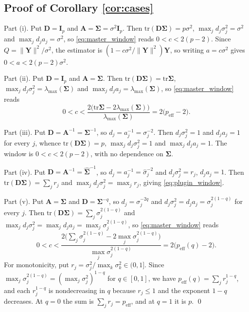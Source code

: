 \documentclass[a4paper,fleqn]{cas-sc}
\theoremstyle{plain}
\theoremstyle{definition}
\theoremstyle{remark}
\newenvironment{revblock}{}{}
\newcommand{\peff}{p_{\mathrm{eff}}}
\newcommand{\peffq}[1]{p_{\mathrm{eff}}(#1)}
\newcommand{\tr}{\mathrm{tr}}
\begin{document}
\begin{appendices}
\subsection*{Proof of Corollary \ref{cor:cases}}

Part (i). Put $\bm D=\bm I_p$ and $\bm A=\bm\Sigma=\sigma^2\bm I_p$. Then $\tr(\bm D\bm\Sigma)=p\sigma^2$, $\max_jd_j\sigma^2_j=\sigma^2$ and $\max_jd_ja_j=\sigma^2$, so \eqref{eq:master_window} reads $0<c<2(p-2)$. Since $Q=\|\bm Y\|^2/\sigma^2$, the estimator is $(1-c\sigma^2/\|\bm Y\|^2)\bm Y$, so writing $a=c\sigma^2$ gives $0<a<2(p-2)\sigma^2$.

Part (ii). Put $\bm D=\bm I_p$ and $\bm A=\bm\Sigma$. Then $\tr(\bm D\bm\Sigma)=\tr\bm\Sigma$, $\max_jd_j\sigma^2_j=\lambda_{\max}(\bm\Sigma)$ and $\max_jd_ja_j=\lambda_{\max}(\bm\Sigma)$, so \eqref{eq:master_window} reads
\begin{equation}
0<c<\frac{2\bigl(\tr\bm\Sigma-2\lambda_{\max}(\bm\Sigma)\bigr)}{\lambda_{\max}(\bm\Sigma)}
=2\bigl(\peff-2\bigr).
\end{equation}

Part (iii). Put $\bm D=\bm A^{-1}=\bm\Sigma^{-1}$, so $d_j=a_j^{-1}=\sigma^{-2}_j$. Then $d_j\sigma^2_j=1$ and $d_ja_j=1$ for every $j$, whence $\tr(\bm D\bm\Sigma)=p$, $\max_jd_j\sigma^2_j=1$ and $\max_jd_ja_j=1$. The window is $0<c<2(p-2)$, with no dependence on $\bm\Sigma$.

Part (iv). Put $\bm D=\bm A^{-1}=\widehat{\bm\Sigma}^{-1}$, so $d_j=a^{-1}_j=\hat\sigma^{-2}_j$ and $d_j\sigma^2_j=r_j$, $d_ja_j=1$. Then $\tr(\bm D\bm\Sigma)=\sum_jr_j$ and $\max_jd_j\sigma^2_j=\max_jr_j$, giving \eqref{eq:plugin_window}.

Part (v). Put $\bm A=\bm\Sigma$ and $\bm D=\bm\Sigma^{-q}$, so $d_j=\sigma_j^{-2q}$ and $d_j\sigma^2_j=d_ja_j=\sigma_j^{2(1-q)}$ for every $j$. Then $\tr(\bm D\bm\Sigma)=\sum_j\sigma_j^{2(1-q)}$ and $\max_jd_j\sigma^2_j=\max_jd_ja_j=\max_j\sigma_j^{2(1-q)}$, so \eqref{eq:master_window} reads
\begin{equation}
0<c<\frac{2\bigl(\sum_j\sigma_j^{2(1-q)}-2\max_j\sigma_j^{2(1-q)}\bigr)}{\max_j\sigma_j^{2(1-q)}}=2\bigl(\peffq{q}-2\bigr).
\end{equation}
For monotonicity, put $r_j=\sigma^2_j/\max_k\sigma^2_k\in(0,1]$. Since $\max_j\sigma_j^{2(1-q)}=(\max_j\sigma^2_j)^{1-q}$ for $q\in[0,1]$, we have $\peffq{q}=\sum_jr_j^{1-q}$, and each $r_j^{1-q}$ is nondecreasing in $q$ because $r_j\le1$ and the exponent $1-q$ decreases. At $q=0$ the sum is $\sum_jr_j=\peff$, and at $q=1$ it is $p$.
\qed


\end{appendices}
\end{document}
